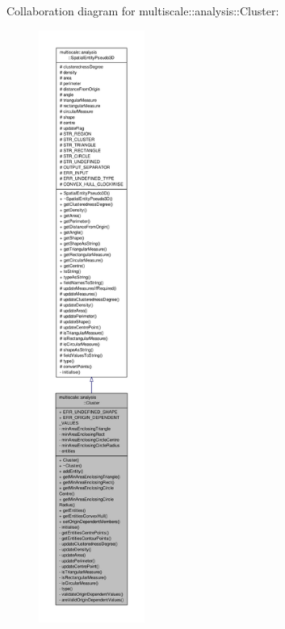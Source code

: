 Collaboration diagram for multiscale\-:\-:analysis\-:\-:Cluster\-:
\nopagebreak
\begin{figure}[H]
\begin{center}
\leavevmode
\includegraphics[height=550pt]{classmultiscale_1_1analysis_1_1Cluster__coll__graph}
\end{center}
\end{figure}
